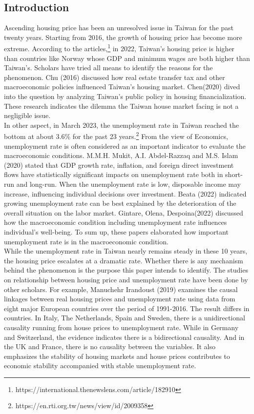 \documentclass[12pt]{article}
\begin{document}
\begin{spacing}{2}
\section{Introduction}
Ascending housing price has been an unresolved issue in Taiwan for the past twenty years. Starting from 2016, the growth of housing price has become more extreme. According to the articles,\footnote[1]{https://international.thenewslens.com/article/182910} in 2022, Taiwan's housing price is higher than countries like Norway whose GDP and minimum wages are both higher than Taiwan's.  Scholars have tried all means to identify the reasons for the phenomenon. Chu (2016) discussed how real estate transfer tax and other macroeconomic policies influenced Taiwan’s housing market. Chen(2020) dived into the question by analyzing Taiwan's public policy in housing financialization. These research indicates the dilemma the Taiwan house market facing is not a negligible issue. \\
\hspace*{1cm} In other aspect, in March 2023, the unemployment rate in Taiwan reached the bottom at about 3.6\% for the past 23 years.\footnote[2]{https://en.rti.org.tw/news/view/id/2009358}
From the view of Economics, unemployment rate is often considered as an important indicator to evaluate the macroeconomic conditions. M.M.H. Mukit, A.I. Abdel-Razzaq and M.S. Islam (2020) stated that GDP growth rate, inflation, and foreign direct investment flows have statistically significant impacts on unemployment rate both in short-run and long-run. When the unemployment rate is low, disposable income may increase, influencing individual decisions over investment. Beata (2022) indicated growing unemployment rate can be best explained by the deterioration of the overall situation on the labor market. Gintare, Olena, Despoina(2022) discussed how the macroeconomic condition including unemployment rate influences individual's well-being. To sum up, these papers elaborated how important unemployment rate is in the macroeconomic condition.\\ 
\hspace*{1cm} While the unemployment rate in Taiwan nearly remains steady in these 10 years, the housing price escalates at a dramatic rate. Whether  there is any mechanism behind the phenomenon is the purpose this paper intends to identify. The studies on relationship between housing price and unemployment rate have been done by other scholars. For example, Manuchehr Irandoust (2019) examines the causal linkages between real housing prices and unemployment rate using data from eight major European countries over the period of 1991-2016. The result differs in countries. In Italy, The Netherlands, Spain and Sweden, there is a unidirectional causality running from house prices to unemployment rate. While in Germany and Switzerland, the evidence indicates there is a bidirectional causality. And in the UK and France, there is no causality between the variables. It also emphasizes the stability of housing markets and house prices contributes to economic stability accompanied with stable unemployment rate.\\

\end{spacing}
\end{document}
